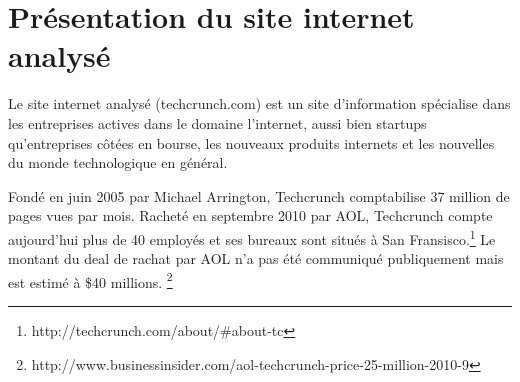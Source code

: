 \documentclass[a4paper,11pt,final]{article}
\begin{document}
  
  \cleardoublepage

  \section{Présentation du site internet analysé}

  Le site internet analysé (techcrunch.com) est un site d'information spécialise dans les entreprises actives dans le domaine l'internet, aussi bien startups qu'entreprises côtées en bourse, les nouveaux produits internets et les nouvelles du monde technologique en général.

  Fondé en juin 2005 par Michael Arrington, Techcrunch comptabilise 37 million de pages vues par mois. Racheté en septembre 2010 par AOL, Techcrunch compte aujourd'hui plus de 40 employés et ses bureaux sont situés à San Fransisco.\footnote{http://techcrunch.com/about/\#about-tc} Le montant du deal de rachat par AOL n'a pas été communiqué publiquement mais est estimé à \$40 millions. \footnote{http://www.businessinsider.com/aol-techcrunch-price-25-million-2010-9}
\end{document}
